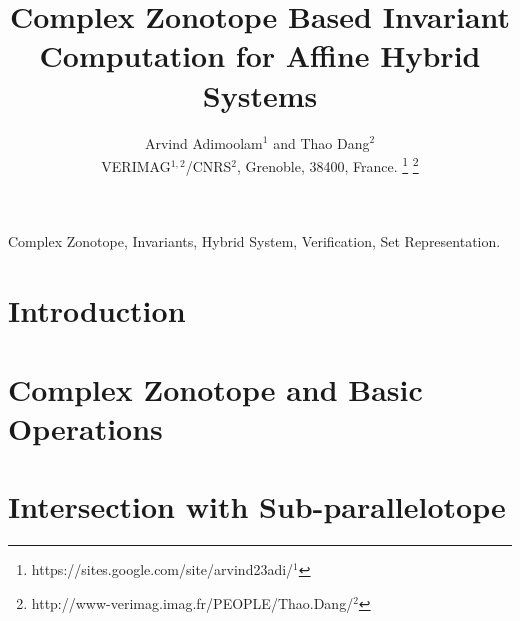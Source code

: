 \documentclass[journal]{./template/stylefiles/IEEEtran}
\begin{document}
\title{Complex Zonotope Based Invariant Computation for Affine Hybrid Systems}

\author{Arvind Adimoolam$^{1}$ and
        Thao Dang$^{2}$\\        
        \small{VERIMAG$^{1,2}$/CNRS$^{2}$, Grenoble, 38400, France.}        
        \thanks{
          {https://sites.google.com/site/arvind23adi/}$^{1}$
        }
        \thanks{
          {http://www-verimag.imag.fr/PEOPLE/Thao.Dang/}$^{2}$
          }
}

\maketitle

\begin{abstract}

\end{abstract}

\begin{IEEEkeywords}
Complex Zonotope, Invariants, Hybrid System, Verification, Set Representation.
\end{IEEEkeywords}

\section{Introduction}


\section{Complex Zonotope and Basic Operations}


\section{Intersection with Sub-parallelotope}



\end{document}
